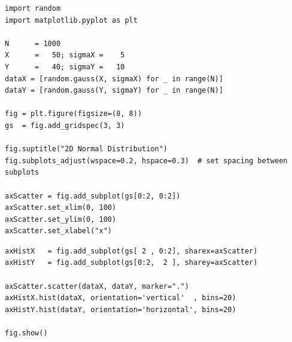 
\begin{frame}[fragile]
%
\begin{codebox}
\begin{verbatim}
import random
import matplotlib.pyplot as plt

N      = 1000
X      =   50; sigmaX =    5
Y      =   40; sigmaY =   10
dataX = [random.gauss(X, sigmaX) for _ in range(N)]
dataY = [random.gauss(Y, sigmaY) for _ in range(N)]

fig = plt.figure(figsize=(8, 8))
gs  = fig.add_gridspec(3, 3)

fig.suptitle("2D Normal Distribution")
fig.subplots_adjust(wspace=0.2, hspace=0.3)  # set spacing between subplots

axScatter = fig.add_subplot(gs[0:2, 0:2])
axScatter.set_xlim(0, 100)
axScatter.set_ylim(0, 100)
axScatter.set_xlabel("x")
\end{verbatim}
\end{codebox}
%
\end{frame}


\begin{frame}[fragile]
%
\begin{codebox}[... continued]
\begin{verbatim}
axHistX   = fig.add_subplot(gs[ 2 , 0:2], sharex=axScatter)
axHistY   = fig.add_subplot(gs[0:2,  2 ], sharey=axScatter)

axScatter.scatter(dataX, dataY, marker=".")
axHistX.hist(dataX, orientation='vertical'  , bins=20)
axHistY.hist(dataY, orientation='horizontal', bins=20)

fig.show()
\end{verbatim}
\end{codebox}
%
\end{frame}


